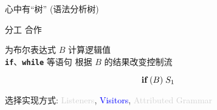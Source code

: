 
\begin{frame}{}
\end{frame}

\begin{frame}
  \begin{center}
    心中有``树'' (语法分析树)
  \end{center}
\end{frame}

\begin{frame}{}
  \begin{center}
    {\Large 分工 \qquad 合作}

    \vspace{0.20cm}
  \end{center}

  \begin{center}
    为布尔表达式 $B$ 计算逻辑值 \\[5pt]
    \texttt{\bf if}、\texttt{\bf while} 等语句
    根据 $B$ 的结果改变控制流
  \end{center}

  \vspace{-0.30cm}
  \[
    \texttt{\bf if}\; (B)\; S_{1}
  \]
\end{frame}

\begin{frame}
  \begin{center}
    选择实现方式: \textcolor{lightgray}{Listeners},
      \textcolor{blue}{Visitors},
      \textcolor{lightgray}{Attributed Grammar}
  \end{center}

  \begin{columns}
  \end{columns}

  \begin{center}
  \end{center}
\end{frame}

\begin{frame}{}
  \begin{center}

    \vspace{0.30cm}
  \end{center}
\end{frame}

